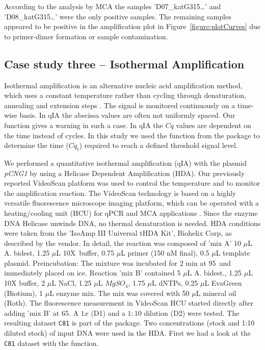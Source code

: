 According to the analysis by MCA the samples 'D07\_katG315\ldots' and 
'D08\_katG315\ldots' were the only positive samples. The remaining samples 
appeared to be positive in the amplification plot in 
Figure~\ref{figure:plotCurves} due to primer-dimer formation or sample 
contamination.

\subsection{Case study three -- Isothermal Amplification}

Isothermal amplification is an alternative nucleic acid amplification method, 
which uses a constant temperature rather than cycling through denaturation, 
annealing and extension steps \citep{rodiger_nucleic_2014}. The signal is 
monitored continuously on a time-wise basis. In qIA the abscissa values are often not 
uniformly spaced. Our  function gives a warning in such 
a case. In qIA the $Cq$ values are dependent on the time instead of cycles. In 
this study we used the  function from the  package 
to determine the time ($Cq_{t}$) required to reach a defined threshold signal 
level.

We performed a quantitative isothermal amplification (qIA) with the plasmid 
\textit{pCNG1} by using a Helicase Dependent Amplification (HDA). Our previously 
reported VideoScan platform \citep{rodiger_highly_2013} was used to control the 
temperature and to monitor the amplification reaction. The VideoScan technology 
is based on a highly versatile fluorescence microscope imaging platform, which 
can be operated with a heating/cooling unit (HCU) for qPCR and MCA applications 
\citep{roediger_RJ_2013, rodiger_highly_2013, Spiess_2014}. Since the enzyme DNA Helicase 
unwinds DNA, no thermal denaturation is needed. HDA conditions were taken 
from the 'IsoAmp III Universal tHDA Kit', Biohelix Corp, as described by the 
vendor. In detail, the reaction was composed of 'mix A' 10 $\mu$L A. bidest, 
1.25 $\mu$L 10X~buffer, 0.75 $\mu$L primer (150 nM final), 0.5 $\mu$L template 
plasmid. Preincubation: The mixture was incubated for 2 min at 
95\textcelsius~and immediately placed on ice. Reaction 'mix B' contained 5 
$\mu$L A. bidest., 1.25 $\mu$L 10X buffer, 2 $\mu$L NaCl, 1.25 $\mu$L 
$MgSO_{4}$, 1.75 $\mu$L dNTPs, 0.25 $\mu$L EvaGreen (Biotium), 1 $\mu$L enzyme 
mix. The mix was covered with 50 $\mu$L mineral oil (Roth). The fluorescence 
measurement in VideoScan HCU started directly after adding 'mix B' at 
65\textcelsius. A $1x$ (D1) and a $1:10$ dilution (D2) were tested. The 
resulting dataset \texttt{C81} is part of the  package. Two 
concentrations (stock and 1:10 diluted stock) of input DNA were used in the HDA. 
First we had a look at the \texttt{C81} dataset with the  
function.

